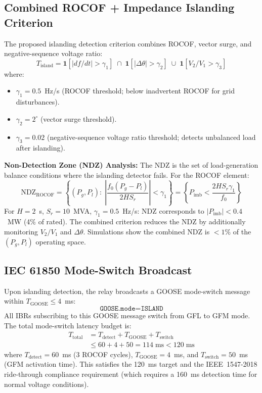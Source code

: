 \subsection{Combined ROCOF + Impedance Islanding Criterion}

The proposed islanding detection criterion combines ROCOF, vector surge,
and negative-sequence voltage ratio:
\begin{equation}
  T_\mathrm{island} = \mathbf{1}\!\left[|df/dt| > \gamma_1\right]
  \;\cap\; \mathbf{1}\!\left[|\Delta\theta| > \gamma_2\right]
  \;\cup\; \mathbf{1}\!\left[V_2/V_1 > \gamma_3\right]
  \label{eq:ch6_island_logic}
\end{equation}
where:
\begin{itemize}
\item $\gamma_1 = 0.5$~Hz/s (ROCOF threshold; below inadvertent ROCOF
      for grid disturbances).
\item $\gamma_2 = 2^\circ{}$ (vector surge threshold).
\item $\gamma_3 = 0.02$ (negative-sequence voltage ratio threshold;
      detects unbalanced load after islanding).
\end{itemize}

\textbf{Non-Detection Zone (NDZ) Analysis:}
The NDZ is the set of load-generation balance conditions where the
islanding detector fails. For the ROCOF element:
\begin{equation}
  \mathrm{NDZ}_\mathrm{ROCOF} = \left\{(P_g, P_l):\;
    \left|\frac{f_0(P_g - P_l)}{2H S_r}\right| < \gamma_1 \right\}
  = \left\{P_\mathrm{imb} < \frac{2H S_r \gamma_1}{f_0}\right\}
  \label{eq:ch6_ndz}
\end{equation}
For $H = 2$~s, $S_r = 10$~MVA, $\gamma_1 = 0.5$~Hz/s:
NDZ corresponds to $|P_\mathrm{imb}| < 0.4$~MW (4\% of rated). The
combined criterion reduces the NDZ by additionally monitoring $V_2/V_1$
and $\Delta\theta$. Simulations show the combined NDZ is $< 1\%$ of
the $(P_g, P_l)$ operating space.

\subsection{IEC 61850 Mode-Switch Broadcast}

Upon islanding detection, the relay broadcasts a GOOSE mode-switch message
within $T_\mathrm{GOOSE} \leq 4$~ms:
\begin{equation}
  \texttt{GOOSE.mode} = \texttt{ISLAND}
  \label{eq:ch6_goose_mode}
\end{equation}
All IBRs subscribing to this GOOSE message switch from GFL to GFM mode.
The total mode-switch latency budget is:
\begin{align}
  T_\mathrm{total} &= T_\mathrm{detect} + T_\mathrm{GOOSE} + T_\mathrm{switch}
  \nonumber \\
  &\leq 60 + 4 + 50 = 114\;\mathrm{ms} < 120\;\mathrm{ms}
  \label{eq:ch6_latency}
\end{align}
where $T_\mathrm{detect} = 60$~ms (3 ROCOF cycles), $T_\mathrm{GOOSE} = 4$~ms,
and $T_\mathrm{switch} = 50$~ms (GFM activation time). This satisfies
the 120~ms target and the IEEE~1547-2018 ride-through compliance requirement
(which requires a 160~ms detection time for normal voltage conditions).

